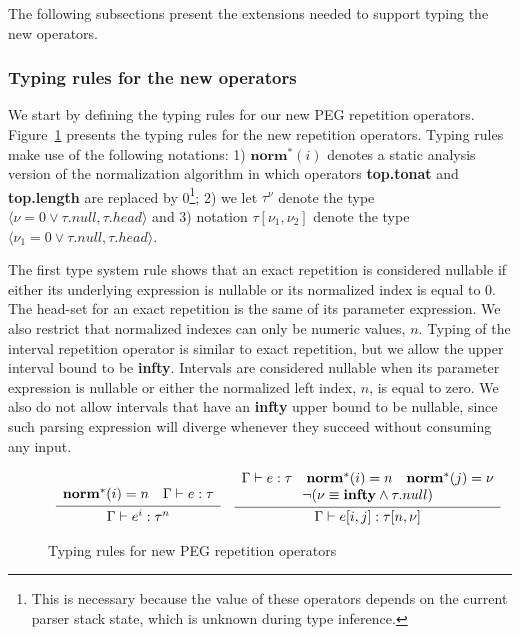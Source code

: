 \documentclass[preprint,12pt]{elsarticle}
\theoremstyle{definition}
\begin{document}
The following subsections present the extensions needed to
support typing the new operators.

\subsubsection{Typing rules for the new operators}

We start by defining the typing rules for our new PEG repetition operators.
Figure~\ref{fig:typing-repetition} presents the typing rules for the new
repetition operators. Typing rules make use of the following notations:
1) $\mathbf{norm}^{\ast}(i)$ denotes a static analysis
version of the normalization algorithm in which operators \textbf{top.tonat}
and \textbf{top.length} are replaced by 0\footnote{This is necessary because the value
of these operators depends on the current parser stack state, which is unknown
during type inference.}; 2) we let $\tau^\nu$ denote the
type $\langle \nu = 0 \lor \tau.null, \tau.head\rangle$ and
3) notation $\tau[\nu_1,\nu_2]$ denote the type
$\langle \nu_1 = 0 \lor \tau.null, \tau.head\rangle$.


The first type system rule shows that an exact repetition is considered
nullable if either its underlying expression is nullable or its normalized index
is equal to $0$. The head-set for an exact repetition is
the same of its parameter expression. We also restrict that normalized indexes can
only be numeric values, $n$.
Typing of the interval repetition operator is similar to exact repetition, but
we allow the upper interval bound to be \textbf{infty}.
Intervals are considered nullable when
its parameter expression is nullable or either the normalized left index, $n$,
is equal to zero. We also do not allow intervals that have an \textbf{infty}
upper bound to be nullable, since such parsing expression will diverge
whenever they succeed without consuming any input.

\begin{figure}[H]
  \[
    \begin{array}{cc}
      \infer{\Gamma \vdash e^i : \tau^n}
            {\begin{array}{c}
              \mathbf{norm}^{\ast}(i) = n\quad \Gamma \vdash e : \tau \\
          \end{array}} &
        \infer{\Gamma\vdash e[i,j] : \tau[n,\nu] }
              {\begin{array}{ccc}
                  \Gamma \vdash e : \tau &
                  \mathbf{norm}^{\ast}(i) = n &
                  \mathbf{norm}^{\ast}(j) = \nu \\
                  \multicolumn{3}{c}{
                  \neg (\nu \equiv \mathbf{infty} \land\tau.null)}
               \end{array}}
    \end{array}
  \]
  \caption{Typing rules for new PEG repetition operators}
  \label{fig:typing-repetition}
\end{figure}
\end{document}
